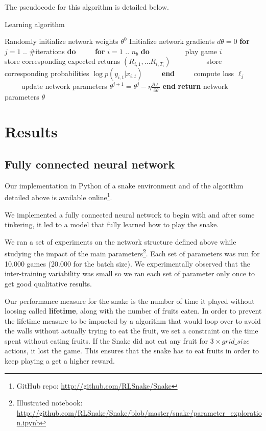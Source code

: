 \documentclass{article}
\begin{document}
The pseudocode for this algorithm is detailed below.

\begin{algorithm}
\caption{Learning algorithm}\label{algo}
\begin{algorithmic}[1]
\Statex Randomly initialize network weights $\theta^0$
\Statex Initialize network gradients $d\theta = 0$
\Statex \textbf{for} $j = 1$ .. \#iterations \textbf{do}
\Statex ~~~~ \textbf{for} $i = 1$ .. $n_b$ \textbf{do}
\Statex ~~~~ ~~~~ play game $i$
\Statex ~~~~ ~~~~ store corresponding expected returns $(R_{i, 1}, \dots R_{i, T_i})$
\Statex ~~~~ ~~~~ store corresponding probabilities $\log p(y_{i, t} | x_{i, t})$
\Statex ~~~~ \textbf{end}
\Statex ~~~~ compute loss $\ell_j$
\Statex ~~~~ update network parameters $\theta^{j+1} = \theta^j -  \eta \frac{\partial \ell}{\partial \theta}$
\Statex \textbf{end}
\Statex\textbf{return} network parameters $\theta$
\end{algorithmic}
\end{algorithm}

\section{Results}
\subsection{Fully connected neural network}
Our implementation in Python of a snake environment and of the algorithm detailed above is available online\footnote{GitHub repo: \url{http://github.com/RLSnake/Snake}}{}.

We implemented a fully connected neural network to begin with and after some tinkering, it led to a model that fully learned how to play the snake.

We ran a set of experiments on the network structure defined above while studying the impact of the main parameters\footnote{Illustrated notebook: \url{http://github.com/RLSnake/Snake/blob/master/snake/parameter_exploration.ipynb}}{}.
Each set of parameters was run for 10.000 games (20.000 for the batch size).
We experimentally observed that the inter-training variability was small so we ran each set of parameter only once to get good qualitative results.

Our performance measure for the snake is the number of time it played without loosing called \textbf{lifetime}, along with the number of fruits eaten.
In order to prevent the lifetime measure to be impacted by a algorithm that would loop over to avoid the walls without actually trying to eat the fruit, we set a constraint on the time spent without eating fruits.
If the Snake did not eat any fruit for $3 \times grid\_size$ actions, it lost the game. This ensures that the snake has to eat fruits in order to keep playing a get a higher reward.
\end{document}
